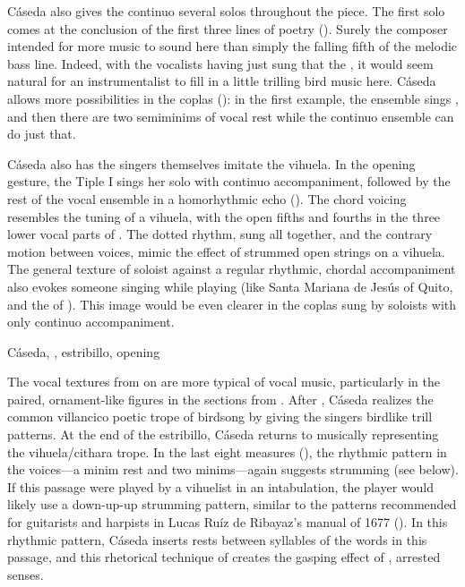 
Cáseda also gives the continuo several solos throughout the piece.
The first solo comes at the conclusion of the first three lines of poetry
().
Surely the composer intended for more music to sound here than simply the
falling fifth of the melodic bass line.
Indeed, with the vocalists having just sung that the , it would seem natural for an instrumentalist
to fill in a little trilling bird music here.
Cáseda allows more possibilities in the coplas (): in the first example, the ensemble sings , and then there are two semiminims of vocal rest while the
continuo ensemble can do just that.


Cáseda also has the singers themselves imitate the vihuela.
In the opening gesture, the Tiple I sings her solo with continuo accompaniment,
followed by the rest of the vocal ensemble in a homorhythmic echo
().
The chord voicing resembles the tuning of a vihuela, with the open fifths and
fourths in the three lower vocal parts of .
The dotted rhythm, sung all together, and the contrary motion between voices,
mimic the effect of strummed open strings on a vihuela.
The general texture of soloist against a regular rhythmic, chordal
accompaniment also evokes someone singing while playing (like Santa Mariana de
Jesús of Quito, and the  of ).
This image would be even clearer in the coplas sung by soloists with only
continuo accompaniment.


{Cáseda, , estribillo, opening}

The vocal textures from  on are more typical of vocal music,
particularly in the paired, ornament-like figures in the sections from
.
After , Cáseda realizes the common villancico poetic trope of
birdsong by giving the singers birdlike trill patterns. 
At the end of the estribillo, Cáseda returns to musically representing the
vihuela/cithara trope.
In the last eight measures (), the rhythmic pattern in the
voices---a minim rest and two minims---again suggests strumming (see
 below).
If this passage were played by a vihuelist in an intabulation, the player would
likely use a down-up-up strumming pattern, similar to the patterns recommended
for guitarists and harpists in Lucas Ruíz de Ribayaz's manual  of 1677 ().%
    \Autocite[9]{Ruiz:Luz}
In this rhythmic pattern, Cáseda inserts rests between syllables of the words
in this passage, and this rhetorical technique of  creates the
gasping effect of , arrested senses.

